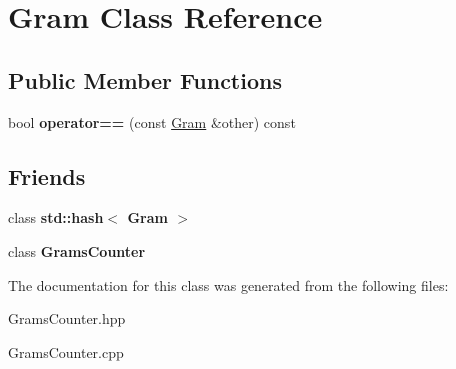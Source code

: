 \hypertarget{classGram}{}\section{Gram Class Reference}
\label{classGram}
\subsection*{Public Member Functions}
\begin{DoxyCompactItemize}
\item 
\mbox{\label{classGram_a03b03e2ae7a911ae18da92336720a2f6}} 
bool {\bfseries operator==} (const \hyperlink{classGram}{Gram} \&other) const
\end{DoxyCompactItemize}
\subsection*{Friends}
\begin{DoxyCompactItemize}
\item 
\mbox{\label{classGram_a7448f2740fc0d47d2dc39bb494954eed}} 
class {\bfseries std\+::hash$<$ Gram $>$}
\item 
\mbox{\label{classGram_a82d274cb5114ab32759b80802e86048b}} 
class {\bfseries Grams\+Counter}
\end{DoxyCompactItemize}


The documentation for this class was generated from the following files\+:\begin{DoxyCompactItemize}
\item 
Grams\+Counter.\+hpp\item 
Grams\+Counter.\+cpp\end{DoxyCompactItemize}
